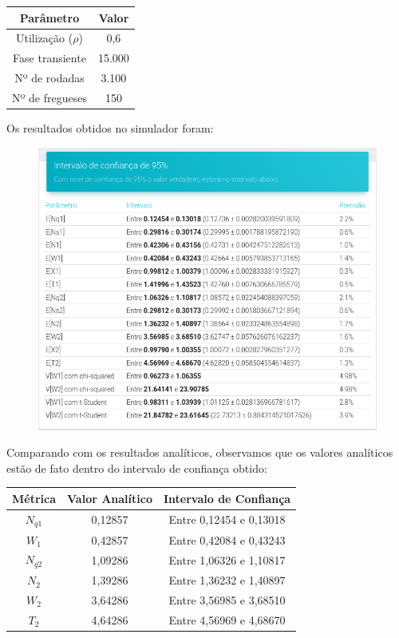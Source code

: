 \documentclass[a4paper,12pt]{report}
\begin{document}
\vspace{-5mm}
\begin{center}
\begin{tabular}{ c c }
  \hline
  \textbf{Parâmetro} & \textbf{Valor}\\
  \hline
  Utilização ($\rho$) & 0,6\\
  Fase transiente & 15.000\\
  Nº de rodadas & 3.100\\
  Nº de fregueses & 150\\
  \hline
\end{tabular}
\end{center}

Os resultados obtidos no simulador foram:
\begin{figure}[H]
\includegraphics[width=1\textwidth]{./graficos/cap4/rho06.png}
\vspace{-10mm}
\end{figure}

Comparando com os resultados analíticos, observamos que os valores analíticos estão de fato dentro do intervalo de confiança obtido:

\vspace{-5mm}
\begin{center}
\begin{tabular}{ c c c }
  \hline
  \textbf{Métrica} & \textbf{Valor Analítico} & \textbf{Intervalo de Confiança} \\
  \hline
  $N_{q1}$ & 0,12857 & Entre 0,12454 e 0,13018 \\
  $W_1$    & 0,42857 & Entre 0,42084 e 0,43243 \\
  $N_{q2}$ & 1,09286 & Entre 1,06326 e 1,10817 \\
  $N_2$    & 1,39286 & Entre 1,36232 e 1,40897 \\
  $W_2$    & 3,64286 & Entre 3,56985 e 3,68510 \\
  $T_2$    & 4,64286 & Entre 4,56969 e 4,68670 \\
  \hline
\end{tabular}
\end{center}
\end{document}
